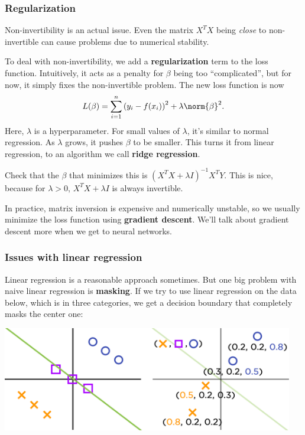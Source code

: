 \documentclass[11pt,paper=letter]{scrartcl}
\begin{document}
\subsubsection*{Regularization}

Non-invertibility is an actual issue. Even the matrix $X^TX$ being \textit{close} to non-invertible can cause problems due to numerical stability.

To deal with non-invertibility, we add a \textbf{regularization} term to the loss function. Intuitively, it acts as a penalty for $\beta$ being too ``complicated'', but for now, it simply fixes the non-invertible problem. The new loss function is now\[
  L(\beta) = \sum_{i=1}^n \left(y_i - f(x_i)\right)^2 + \lambda\norm{\beta}^2.
\]
Here, $\lambda$ is a hyperparameter. For small values of $\lambda$, it's similar to normal regression. As $\lambda$ grows, it pushes $\beta$ to be smaller. This turns it from linear regression, to an algorithm we call \textbf{ridge regression}.
\begin{exrboxed}
  Check that the $\beta$ that minimizes this is $(X^TX + \lambda I)^{-1}X^TY$. This is nice, because for $\lambda > 0$, $X^TX + \lambda I$ is always invertible.
\end{exrboxed}
In practice, matrix inversion is expensive and numerically unstable, so we usually minimize the loss function using \textbf{gradient descent}. We'll talk about gradient descent more when we get to neural networks.

\subsubsection*{Issues with linear regression}

Linear regression is a reasonable approach sometimes. But one big problem with naive linear regression is \textbf{masking}. If we try to use linear regression on the data below, which is in three categories, we get a decision boundary that completely masks the center one:

\begin{center}
  \includegraphics[height=1.8in]{9.png}
\end{center}
\end{document}
